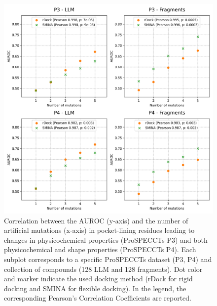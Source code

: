 \begin{figure}[htbp]
  \centering
  \includegraphics[width=0.8\linewidth]{figures/PocketVec/Supplementary/FigS9.png}
  \caption{
  Correlation between the AUROC (y-axis) and the number of artificial mutations (x-axis) in pocket-lining residues leading to changes in physicochemical properties (ProSPECCTs P3) and both physicochemical and shape properties (ProSPECCTs P4). Each subplot corresponds to a specific ProSPECCTs dataset (P3, P4) and collection of compounds (128 LLM and 128 fragments). Dot color and marker indicate the used docking method (rDock for rigid docking and SMINA for flexible docking). In the legend, the corresponding Pearson’s Correlation Coefficients are reported. 
  }
  \label{FigS9}
\end{figure}

